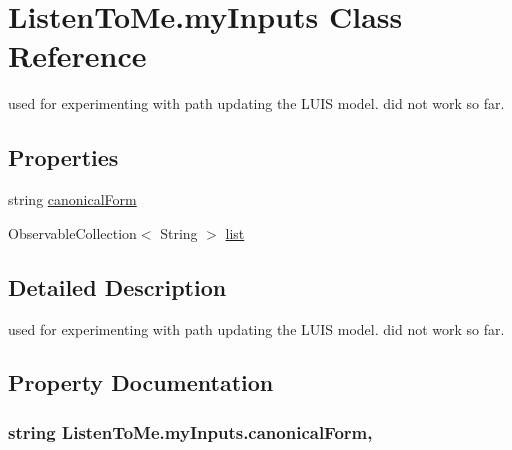 \hypertarget{class_listen_to_me_1_1my_inputs}{}\section{Listen\+To\+Me.\+my\+Inputs Class Reference}
\label{class_listen_to_me_1_1my_inputs}


used for experimenting with path updating the L\+U\+IS model. did not work so far.  


\subsection*{Properties}
\begin{DoxyCompactItemize}
\item 
string \hyperlink{class_listen_to_me_1_1my_inputs_a6e63baf613d06d2fe0c196e3214c7b47}{canonical\+Form}
\item 
Observable\+Collection$<$ String $>$ \hyperlink{class_listen_to_me_1_1my_inputs_afa576673bde85df5836d17fb36f2d949}{list}
\end{DoxyCompactItemize}


\subsection{Detailed Description}
used for experimenting with path updating the L\+U\+IS model. did not work so far. 



\subsection{Property Documentation}
\subsubsection[{\texorpdfstring{canonical\+Form}{canonicalForm}}]{\setlength{\rightskip}{0pt plus 5cm}string Listen\+To\+Me.\+my\+Inputs.\+canonical\+Form\hspace{0.3cm}{\ttfamily [get]}, {\ttfamily [set]}}\hypertarget{class_listen_to_me_1_1my_inputs_a6e63baf613d06d2fe0c196e3214c7b47}{}\label{class_listen_to_me_1_1my_inputs_a6e63baf613d06d2fe0c196e3214c7b47}
